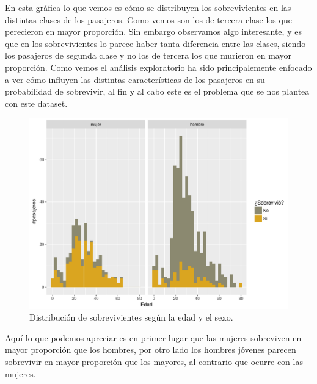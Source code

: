 \documentclass[10pt,a4paper]{article}
\begin{document}
En esta gráfica lo que vemos es cómo se distribuyen los sobrevivientes en las distintas clases de los pasajeros. Como vemos son los de tercera clase los que perecieron en mayor proporción. Sin embargo observamos algo interesante, y es que en los sobrevivientes lo parece haber tanta diferencia entre las clases, siendo los pasajeros de segunda clase y no los de tercera los que murieron en mayor proporción. Como vemos el análisis exploratorio ha sido principalemente enfocado a ver cómo influyen las distintas características de los pasajeros en su probabilidad de sobrevivir, al fin y al cabo este es el problema que se nos plantea con este dataset.\\

\begin{figure}[H]
  \centering
  \includegraphics[width=\textwidth]{imgs/age.pdf}
  \caption{Distribución de sobrevivientes según la edad y el sexo.}
\end{figure}

Aquí lo que podemos apreciar es en primer lugar que las mujeres sobreviven en mayor proporción que los hombres, por otro lado los hombres jóvenes parecen sobrevivir en mayor proporción que los mayores, al contrario que ocurre con las mujeres.
\end{document}
